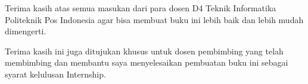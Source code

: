 Terima kasih atas semua masukan dari para dosen D4 Teknik Informatika Politeknik Pos Indonesia agar bisa membuat buku ini 
lebih baik dan lebih mudah dimengerti.

Terima kasih ini juga ditujukan khusus untuk dosen pembimbing yang 
telah membimbing dan membantu saya menyelesaikan pembuatan buku ini sebagai syarat kelulusan Internship.
